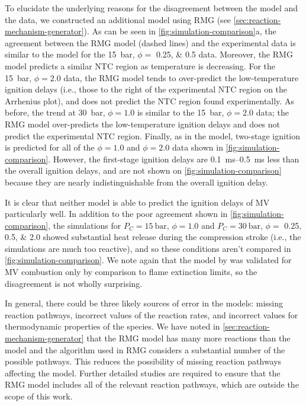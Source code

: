 \documentclass[letterpaper, review, sort&compress]{elsarticle}
\begin{document}
To elucidate the underlying reasons for the disagreement between the \citet{Dievart2013} model and
the data, we constructed an additional model using RMG (see
\cref{sec:reaction-mechanism-generator}). As can be seen in \cref{fig:simulation-comparison}a, the
agreement between the RMG model (dashed lines) and the experimental data is similar to the
\citet{Dievart2013} model for the \SI{15}{\bar}, \(\phi =\) \numlist{0.25; 0.5} data. Moreover, the
RMG model predicts a similar NTC region as temperature is decreasing. For the \SI{15}{\bar}, \(\phi =
2.0\) data, the RMG model tends to over-predict the low-temperature ignition delays (i.e., those to
the right of the experimental NTC region on the Arrhenius plot), and does not predict the NTC region
found experimentally. As before, the trend at \SI{30}{\bar}, \(\phi=1.0\) is similar to the
\SI{15}{\bar}, \(\phi=2.0\) data; the RMG model over-predicts the low-temperature ignition delays
and does not predict the experimental NTC region. Finally, as in the \citet{Dievart2013} model,
two-stage ignition is predicted for all of the \(\phi=1.0\) and \(\phi=2.0\) data shown in
\cref{fig:simulation-comparison}. However, the first-stage ignition delays are
\SIrange{0.1}{0.5}{\ms} less than the overall ignition delays, and are not shown on
\cref{fig:simulation-comparison} because they are nearly indistinguishable from the overall ignition
delay.

It is clear that neither model is able to predict the ignition delays of MV particularly well. In
addition to the poor agreement shown in \cref{fig:simulation-comparison}, the simulations for
\(P_C = \SI{15}{\bar}\), \(\phi=1.0\) and \(P_C = \SI{30}{\bar}\), \(\phi=\) \numlist{0.25;0.5;2.0}
showed substantial heat release during the compression stroke (i.e., the simulations are much too
reactive), and so these conditions aren't compared in \cref{fig:simulation-comparison}. We note
again that the model by \citet{Dievart2013} was validated for MV combustion only by comparison to
flame extinction limits, so the disagreement is not wholly surprising.

In general, there could be three likely sources of error in the models: missing reaction pathways,
incorrect values of the reaction rates, and incorrect values for thermodynamic properties of the
species. We have noted in \cref{sec:reaction-mechanism-generator} that the RMG model has many more
reactions than the \citet{Dievart2013} model and the algorithm used in RMG considers a substantial
number of the possible pathways. This reduces the possibility of missing reaction pathways affecting
the model. Further detailed studies are required to ensure that the RMG model includes all of the
relevant reaction pathways, which are outside the scope of this work.
\end{document}
